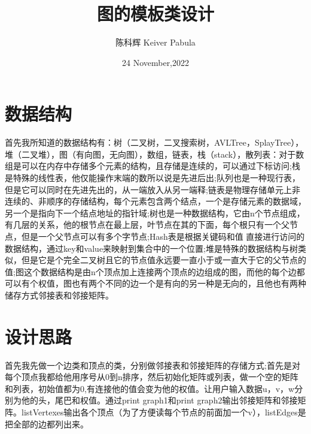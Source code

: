 \documentclass{ctexart}
\title{图的模板类设计}
\author{陈科辉 Keiver Pabula}
\date{24 November,2022}
\begin{document}
\maketitle

\section{数据结构}
首先我所知道的数据结构有：树（二叉树，二叉搜索树，AVLTree，SplayTree），堆（二叉堆），图（有向图，无向图），数组，链表，栈（stack），散列表：对于数组是可以在内存中存储多个元素的结构，且存储是连续的，可以通过下标访问;栈是特殊的线性表，他仅能操作末端的数所以说是先进后出;队列也是一种现行表，但是它可以同时在先进先出的，从一端放入从另一端释;链表是物理存储单元上非连续的、非顺序的存储结构，每个元素包含两个结点，一个是存储元素的数据域，另一个是指向下一个结点地址的指针域;树也是一种数据结构，它由n个节点组成，有几层的关系，他的根节点在最上层，叶节点在其的下面，每个根只有一个父节点，但是一个父节点可以有多个字节点;Hash表是根据关键码和值 直接进行访问的数据结构，通过key和value来映射到集合中的一个位置;堆是特殊的数据结构与树类似，但是它是个完全二叉树且它的节点值永远要一直小于或一直大于它的父节点的值;图这个数据结构是由n个顶点加上连接两个顶点的边组成的图，而他的每个边都可以有个权值，图也有两个不同的边一个是有向的另一种是无向的，且他也有两种储存方式邻接表和邻接矩阵。

\section{设计思路}
首先我先做一个边类和顶点的类，分别做邻接表和邻接矩阵的存储方式;首先是对每个顶点我都给他用序号从0到n排序，然后初始化矩阵或列表，做一个空的矩阵和列表，初始值都为0,有连接他的值会变为他的权值。让用户输入数据u，v，w分别为他的头，尾巴和权值。通过print graph1和print graph2输出邻接矩阵和邻接矩阵。listVertexes输出各个顶点（为了方便读每个节点的前面加一个v），listEdges是把全部的边都列出来。
\end{document}
